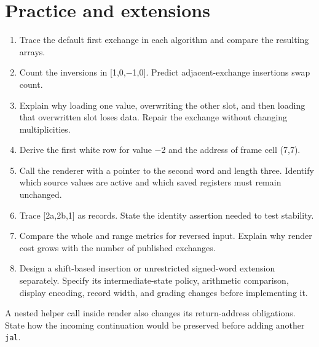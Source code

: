 \section{Practice and
  extensions}\label{009-sorting-visualizer-x-practice-practice-and-extensions}

\begin{enumerate}
  \def\labelenumi{\arabic{enumi}.}
  \tightlist
  \item
        Trace the default first exchange in each algorithm and compare the
        resulting arrays.
  \item
        Count the inversions in {[}1,0,\ensuremath{-}1,0{]}. Predict adjacent-exchange
        insertion\textquotesingle s swap count.
  \item
        Explain why loading one value, overwriting the other slot, and then
        loading that overwritten slot loses data. Repair the exchange without
        changing multiplicities.
  \item
        Derive the first white row for value \ensuremath{-}2 and the address of frame cell
        (7,7).
  \item
        Call the renderer with a pointer to the second word and length three.
        Identify which source values are active and which saved registers must
        remain unchanged.
  \item
        Trace {[}2a,2b,1{]} as records. State the identity assertion needed to
        test stability.
  \item
        Compare the whole and range metrics for reversed input. Explain why
        render cost grows with the number of published exchanges.
  \item
        Design a shift-based insertion or unrestricted signed-word extension
        separately. Specify its intermediate-state policy, arithmetic
        comparison, display encoding, record width, and grading changes before
        implementing it.
\end{enumerate}

A nested helper call inside render also changes its return-address
obligations. State how the incoming continuation would be preserved
before adding another \texttt{jal}.
